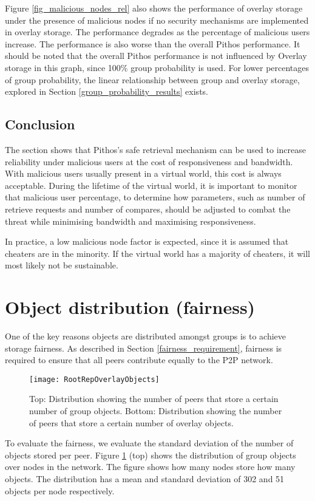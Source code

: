 Figure \ref{fig_malicious_nodes_rel} also shows the performance of overlay storage under the presence of malicious nodes if no security mechanisms are implemented in overlay storage. The performance degrades as the percentage of malicious users increase. The performance is also worse than the overall Pithos performance.  It should be noted that the overall Pithos performance is not influenced by Overlay storage in this graph, since 100\% group probability is used. For lower percentages of group probability, the linear relationship between group and overlay storage, explored in Section \ref{group_probability_results} exists.

\subsection{Conclusion}

The section shows that Pithos's safe retrieval mechanism can be used to increase reliability under malicious users at the cost of responsiveness and bandwidth. With malicious users usually present in a virtual world, this cost is always acceptable. During the lifetime of the virtual world, it is important to monitor that malicious user percentage, to determine how parameters, such as number of retrieve requests and number of compares, should be adjusted to combat the threat while minimising bandwidth and maximising responsiveness.

In practice, a low malicious node factor is expected, since it is assumed that cheaters are in the minority. If the virtual world has a majority of cheaters, it will most likely not be sustainable.

\section{Object distribution (fairness)}

One of the key reasons objects are distributed amongst groups is to achieve storage fairness. As described in Section \ref{fairness_requirement}, fairness is required to ensure that all peers contribute equally to the P2P network.

\begin{figure}[htbp]
 \centering
 \texttt{[image: RootRepOverlayObjects]}
 \caption{Top: Distribution showing the number of peers that store a certain number of group objects. Bottom: Distribution showing the number of peers that store a certain number of overlay objects.}
 \label{fig_group_overlay_objects}
\end{figure}
%
To evaluate the fairness, we evaluate the standard deviation of the number of objects stored per peer. Figure \ref{fig_group_overlay_objects} (top) shows the distribution of group objects over nodes in the network. The figure shows how many nodes store how many objects. The distribution has a mean and standard deviation of 302 and 51 objects per node respectively.

